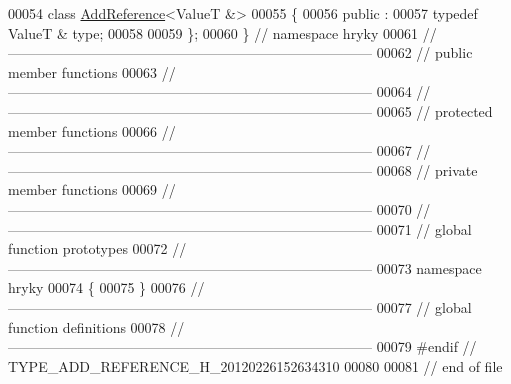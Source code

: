 \begin{DoxyCode}
00054 \textcolor{keyword}{class }\hyperlink{classhryky_1_1_add_reference}{AddReference}<ValueT &>
00055 \{
00056 \textcolor{keyword}{public} :
00057     \textcolor{keyword}{typedef} ValueT &       type;
00058 
00059 \};
00060 \} \textcolor{comment}{// namespace hryky}
00061 \textcolor{comment}{//
      ------------------------------------------------------------------------------}
00062 \textcolor{comment}{// public member functions}
00063 \textcolor{comment}{//
      ------------------------------------------------------------------------------}
00064 \textcolor{comment}{//
      ------------------------------------------------------------------------------}
00065 \textcolor{comment}{// protected member functions}
00066 \textcolor{comment}{//
      ------------------------------------------------------------------------------}
00067 \textcolor{comment}{//
      ------------------------------------------------------------------------------}
00068 \textcolor{comment}{// private member functions}
00069 \textcolor{comment}{//
      ------------------------------------------------------------------------------}
00070 \textcolor{comment}{//
      ------------------------------------------------------------------------------}
00071 \textcolor{comment}{// global function prototypes}
00072 \textcolor{comment}{//
      ------------------------------------------------------------------------------}
00073 \textcolor{keyword}{namespace }hryky
00074 \{
00075 \}
00076 \textcolor{comment}{//
      ------------------------------------------------------------------------------}
00077 \textcolor{comment}{// global function definitions}
00078 \textcolor{comment}{//
      ------------------------------------------------------------------------------}
00079 \textcolor{preprocessor}{#endif // TYPE\_ADD\_REFERENCE\_H\_20120226152634310}
00080 \textcolor{preprocessor}{}
00081 \textcolor{comment}{// end of file}
\end{DoxyCode}
